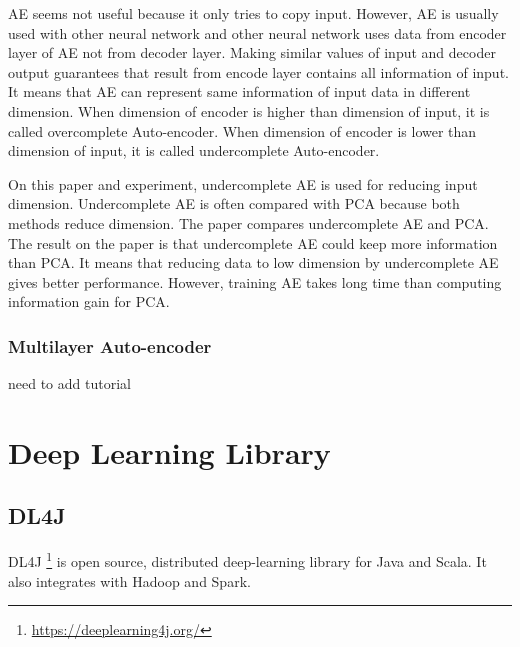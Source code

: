\documentclass[draft,dvipsnames]{drexel-thesis}
\begin{document}
\begin{thesis}
AE seems not useful because it only tries to copy input. However, AE is usually used with other neural network and other neural network uses data from encoder layer of AE not from decoder layer. Making similar values of input and decoder output guarantees that result from encode layer contains all information of input. It means that AE can represent same information of input data in different dimension. When dimension of encoder is higher than dimension of input, it is called overcomplete Auto-encoder. When dimension of encoder is lower than dimension of input, it is called undercomplete Auto-encoder.

On this paper and experiment, undercomplete AE is used for reducing input dimension. Undercomplete AE is often compared with PCA because both methods reduce dimension. The paper \cite{hinton2006reducing} compares undercomplete AE and PCA. The result on the paper is that undercomplete AE could keep more information than PCA. It means that reducing data to low dimension by undercomplete AE gives better performance. However, training AE takes long time than computing information gain for PCA.



\subsubsection{Multilayer Auto-encoder}\label{subsubsec:MAE}
{\color{blue} need to add tutorial}

\section{Deep Learning Library}\label{sec:DLL}
\subsection{DL4J}
DL4J \footnote{\url{https://deeplearning4j.org/}} is open source, distributed deep-learning library for Java and Scala. It also integrates with Hadoop and Spark. 


\end{thesis}
\end{document}

